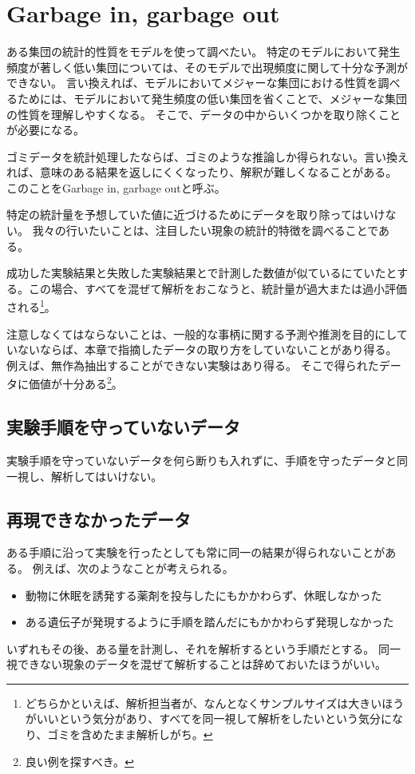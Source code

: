 \section{Garbage in, garbage out}

ある集団の統計的性質をモデルを使って調べたい。
特定のモデルにおいて発生頻度が著しく低い集団については、そのモデルで出現頻度に関して十分な予測ができない。
言い換えれば、モデルにおいてメジャーな集団における性質を調べるためには、モデルにおいて発生頻度の低い集団を省くことで、メジャーな集団の性質を理解しやすくなる。
そこで、データの中からいくつかを取り除くことが必要になる。


ゴミデータを統計処理したならば、ゴミのような推論しか得られない。言い換えれば、意味のある結果を返しにくくなったり、解釈が難しくなることがある。
このことをGarbage in, garbage outと呼ぶ。



特定の統計量を予想していた値に近づけるためにデータを取り除ってはいけない。
我々の行いたいことは、注目したい現象の統計的特徴を調べることである。

成功した実験結果と失敗した実験結果とで計測した数値が似ているにていたとする。この場合、すべてを混ぜて解析をおこなうと、統計量が過大または過小評価される\footnote{どちらかといえば、解析担当者が、なんとなくサンプルサイズは大きいほうがいいという気分があり、すべてを同一視して解析をしたいという気分になり、ゴミを含めたまま解析しがち。}。


注意しなくてはならないことは、一般的な事柄に関する予測や推測を目的にしていないならば、本章で指摘したデータの取り方をしていないことがあり得る。
例えば、無作為抽出することができない実験はあり得る。
そこで得られたデータに価値が十分ある\footnote{良い例を探すべき。}。%
\fi

\subsection{実験手順を守っていないデータ}
実験手順を守っていないデータを何ら断りも入れずに、手順を守ったデータと同一視し、解析してはいけない。


\subsection{再現できなかったデータ}
ある手順に沿って実験を行ったとしても常に同一の結果が得られないことがある。
例えば、次のようなことが考えられる。
\begin{itemize}
    \item 動物に休眠を誘発する薬剤を投与したにもかかわらず、休眠しなかった
    \item ある遺伝子が発現するように手順を踏んだにもかかわらず発現しなかった
\end{itemize}
いずれもその後、ある量を計測し、それを解析するという手順だとする。
同一視できない現象のデータを混ぜて解析することは辞めておいたほうがいい。

